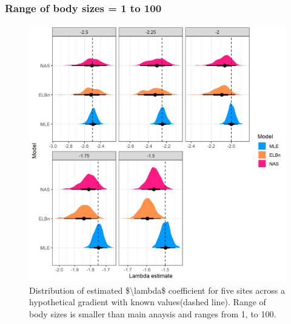\documentclass[
]{article}
\begin{document}
\newpage

\hypertarget{range-of-body-sizes-1-to-100}{%
\subsubsection{Range of body sizes = 1 to
100}\label{range-of-body-sizes-1-to-100}}

\begin{figure}
\centering
\includegraphics{figures/PLB_small_m_est_b_density.png}
\caption{Distribution of estimated \$\textbackslash lambda\$ coefficient
for five sites across a hypothetical gradient with known values(dashed
line). Range of body sizes is smaller than main anaysis and ranges from
1, to 100.}
\end{figure}

\newpage
\end{document}
